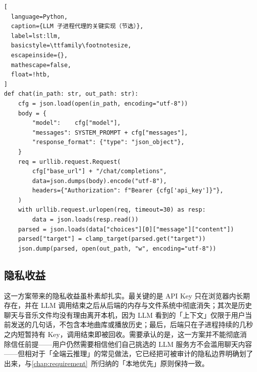 \begin{lstlisting}[
  language=Python,
  caption={LLM 子进程代理的关键实现（节选）},
  label=lst:llm,
  basicstyle=\ttfamily\footnotesize,
  escapeinside={},
  mathescape=false,
  float=!htb,
]
def chat(in_path: str, out_path: str):
    cfg = json.load(open(in_path, encoding="utf-8"))
    body = {
        "model":    cfg["model"],
        "messages": SYSTEM_PROMPT + cfg["messages"],
        "response_format": {"type": "json_object"},
    }
    req = urllib.request.Request(
        cfg["base_url"] + "/chat/completions",
        data=json.dumps(body).encode("utf-8"),
        headers={"Authorization": f"Bearer {cfg['api_key']}"},
    )
    with urllib.request.urlopen(req, timeout=30) as resp:
        data = json.loads(resp.read())
    parsed = json.loads(data["choices"][0]["message"]["content"])
    parsed["target"] = clamp_target(parsed.get("target"))
    json.dump(parsed, open(out_path, "w", encoding="utf-8"))
\end{lstlisting}

\subsection{隐私收益}

这一方案带来的隐私收益虽朴素却扎实。最关键的是 API Key 只在浏览器内长期存在，并在 LLM 调用结束之后从后端的内存与文件系统中彻底消失；其次是历史聊天与音乐文件均没有理由离开本机，因为 LLM 看到的「上下文」仅限于用户当前发送的几句话，不包含本地曲库或播放历史；最后，后端只在子进程持续的几秒之内短暂持有 Key，调用结束即被回收。需要承认的是，这一方案并不能彻底消除信任前提——用户仍然需要相信他们自己挑选的 LLM 服务方不会滥用聊天内容——但相对于「全端云推理」的常见做法，它已经把可被审计的隐私边界明确划了出来，与\cref{chap:requirement}~所归纳的「本地优先」原则保持一致。
